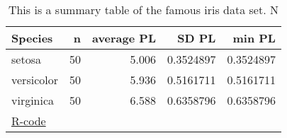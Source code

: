 \begin{table}

\caption{\label{tab:}This is a summary table of the famous iris data set. N
        }
\centering
\begin{tabular}[t]{lrrrr}
\toprule
Species & n & average PL & SD PL & min PL\\
\midrule
setosa & 50 & 5.006 & 0.3524897 & 0.3524897\\
versicolor & 50 & 5.936 & 0.5161711 & 0.5161711\\
virginica & 50 & 6.588 & 0.6358796 & 0.6358796\\
\bottomrule
\multicolumn{5}{l}{\href{https://github.com/TobiasRoth/RtoAuthorea/blob/master/tables/latex_table/latex_table.R}{R-code}}\\
\end{tabular}
\end{table}
